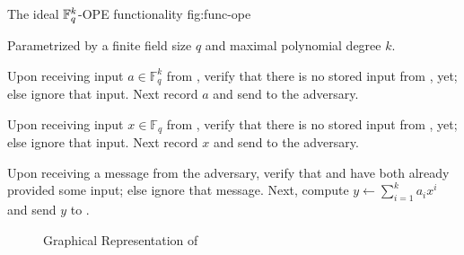 %
%
\label{sec:protocol}

\begin{JWfunc}%
  {\JWfuncSymOPE}%
  {The ideal $\mathbb{F}_q^k{}$-OPE functionality \JWfuncSymOPE{}}%
  {fig:func-ope}

  Parametrized by a finite field size $q$ and maximal polynomial degree $k$.

  \begin{JWfuncSteps}

  \item Upon receiving input $a \in \mathbb{F}_q^k$ from \JWpOne{}, verify that
    there is no stored input from \JWpOne{}, yet; else ignore that input. Next
    record $a$ and send  to the adversary.

  \item Upon receiving input $x \in \mathbb{F}_q$ from \JWpTwo{}, verify that
    there is no stored input from \JWpTwo{}, yet; else ignore that input. Next
    record $x$ and send  to the adversary.

  \item Upon receiving a message  from the
    adversary, verify that \JWpTwo{} and \JWpOne{} have both already provided
    some input; else ignore that message. Next, compute $y \leftarrow
    \sum_{i=1}^k a_ix^i$ and send $y$ to \JWpTwo{}.

  \end{JWfuncSteps}
\end{JWfunc}

\begin{figure}[ht]

  \label{fig:graph-ope}
  \centering


  \caption{Graphical Representation of \JWfuncSymOPE}

\end{figure}

